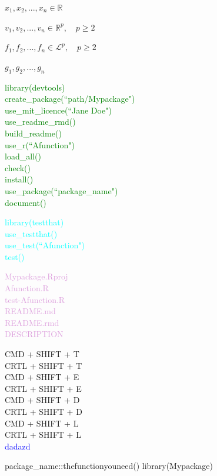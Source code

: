 \documentclass{article}
\begin{document}
\newpage

$x_1,  x_2, ... , x_n \in \mathbb{R}$

 \vspace{0.8cm}
 
 $v_1,  v_2, ... , v_n \in \mathbb{R}^p,  \quad p \geq 2$
 
  \vspace{0.8cm}
  
  $f_1,  f_2, ... , f_n \in \mathcal{L}^p,  \quad p \geq 2$
  
   \vspace{0.8cm}
   
   $g_1,  g_2, ... , g_n$
   \vspace{0.8cm}
      
 \textcolor{Green}{library(devtools)\\
 create\_package(“path/Mypackage")\\
 use\_mit\_licence(“Jane Doe")\\
 use\_readme\_rmd()\\
 build\_readme()\\
 use\_r(“Afunction")\\
 load\_all()\\
 check()\\
 install()\\
  use\_package(“package\_name")\\
  document()\\
 }      
 
      
         \vspace{0.8cm}
         
          \textcolor{Cyan}{library(testthat)\\
 use\_testthat()\\
 use\_test(“Afunction")\\
 test()
 }
         
            \vspace{0.8cm}
   
             \textcolor{Plum}{
Mypackage.Rproj \\         
Afunction.R \\
test-Afunction.R \\
README.md \\
README.rmd \\
DESCRIPTION
 }
 
 CMD + SHIFT + T\\
 CRTL + SHIFT + T\\
 
 CMD + SHIFT + E\\
 CRTL + SHIFT + E\\
 
  CMD + SHIFT + D\\
 CRTL + SHIFT + D\\
 
  CMD + SHIFT + L\\
 CRTL + SHIFT + L\\ 
 
 
        \textcolor{Blue}{dadazd}
        
        package\_name::thefunctionyouneed()
        library(Mypackage)
\end{document}
